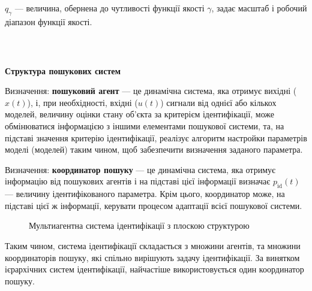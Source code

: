 \documentclass[14pt,handout,utf8]{beamer}
\newcommand{\Xhead}[1]{
 \begin{center}%
      \textbf{#1}%
 \end{center}%
}
\begin{document}
\begin{frame}
 $q_\gamma$\label{atu:d:q_gamma}
  --- величина, обернена до чутливості функції якості $\gamma$,
  задає масштаб і робочий діапазон функції якості.


\end{frame}



\begin{frame}
  \frametitle{~}

  \Xhead{Структура пошукових систем}

  Визначення:
  \textbf{пошуковий агент} --- це динамічна система, яка отримує вихідні ($x(t)$),
  і, при необхідності, вхідні ($u(t)$) сигнали від однієї або кількох моделей,
  величину оцінки стану об'єкта за критерієм ідентифікації,
  може обмінюватися інформацією з іншими елементами пошукової системи,
  та, на підставі значення критерію
  ідентифікації, реалізує алгоритм настройки параметрів моделі (моделей) таким
  чином, щоб забезпечити визначення заданого параметра.

  \medskip

  Визначення:
  \textbf{координатор пошуку} --- це динамічна система, яка отримує інформацію
  від пошукових агентів і на підставі цієї інформації визначає
  $p_{\mathrm{id}}(t)$ --- величину ідентифікованого параметра.
  Крім цього, координатор може, на підставі цієї ж інформації,
  керувати процесом адаптації всієї пошукової системи.


  \begin{figure}[htb!]
    \begin{center}
      
    \end{center}
    \caption{Мультиагентна система ідентифікації з плоскою структурою}
    \label{atu:f:agents_flat}
  \end{figure}

  Таким чином, система ідентифікації складається з множини агентів, та
  множини координаторів пошуку, які спільно вирішують задачу ідентифікації.
  За винятком ієрархічних систем ідентифікації, найчастіше використовується один координатор пошуку.

\end{frame}

\end{document}
